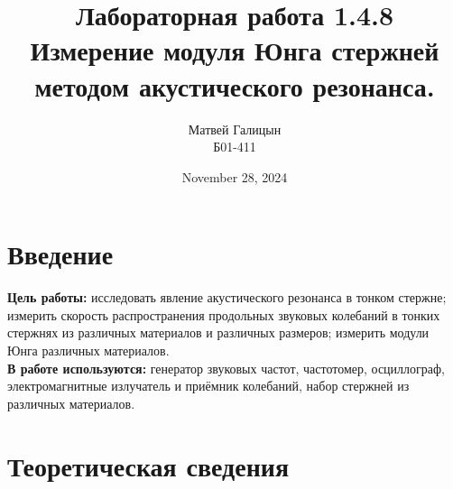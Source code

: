 \documentclass[a4paper, 10pt, twocolumn]{article}
\title{Лабораторная работа 1.4.8 \\ Измерение модуля Юнга стержней методом акустического резонанса.}
\author{Матвей Галицын \\ Б01-411}
\date{November 28, 2024}
\begin{document}
\maketitle
\newpage{}
\section{Введение}
\textbf{Цель работы:} исследовать явление акустического резонанса в тонком стержне; измерить скорость
распространения продольных звуковых колебаний в тонких стержнях из различных материалов и различных 
размеров; измерить модули Юнга различных материалов.\\
\textbf{В работе используются:} генератор звуковых частот, частотомер, осциллограф, электромагнитные 
излучатель и приёмник колебаний, набор стержней из различных материалов.

\section{Теоретическая сведения}
\end{document}
